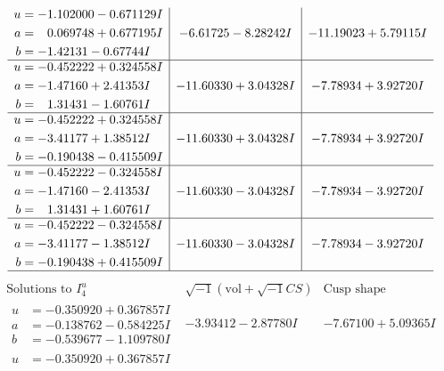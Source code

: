 \documentclass[1p]{elsarticle_modified}
\theoremstyle{definition}
\newcommand{\I}{\sqrt{-1}}
\begin{document}
$$\begin{array}{c|c|c}
\begin{aligned}
u &= -1.102000 - 0.671129 I \\
a &= \phantom{-}0.069748 + 0.677195 I \\
b &= -1.42131 - 0.67744 I\end{aligned}
 & -6.61725 - 8.28242 I & -11.19023 + 5.79115 I \\ \hline\begin{aligned}
u &= -0.452222 + 0.324558 I \\
a &= -1.47160 + 2.41353 I \\
b &= \phantom{-}1.31431 - 1.60761 I\end{aligned}
 & -11.60330 + 3.04328 I & -7.78934 + 3.92720 I \\ \hline\begin{aligned}
u &= -0.452222 + 0.324558 I \\
a &= -3.41177 + 1.38512 I \\
b &= -0.190438 - 0.415509 I\end{aligned}
 & -11.60330 + 3.04328 I & -7.78934 + 3.92720 I \\ \hline\begin{aligned}
u &= -0.452222 - 0.324558 I \\
a &= -1.47160 - 2.41353 I \\
b &= \phantom{-}1.31431 + 1.60761 I\end{aligned}
 & -11.60330 - 3.04328 I & -7.78934 - 3.92720 I \\ \hline\begin{aligned}
u &= -0.452222 - 0.324558 I \\
a &= -3.41177 - 1.38512 I \\
b &= -0.190438 + 0.415509 I\end{aligned}
 & -11.60330 - 3.04328 I & -7.78934 - 3.92720 I\\
 \hline 
 \end{array}$$\newpage$$\begin{array}{c|c|c}  
\text{Solutions to }I^u_{4}& \I (\text{vol} + \sqrt{-1}CS) & \text{Cusp shape}\\
 \hline 
\begin{aligned}
u &= -0.350920 + 0.367857 I \\
a &= -0.138762 - 0.584225 I \\
b &= -0.539677 - 1.109780 I\end{aligned}
 & -3.93412 - 2.87780 I & -7.67100 + 5.09365 I \\ \hline\begin{aligned}
u &= -0.350920 + 0.367857 I \\

\end{aligned}
\end{array}$$
\end{document}
